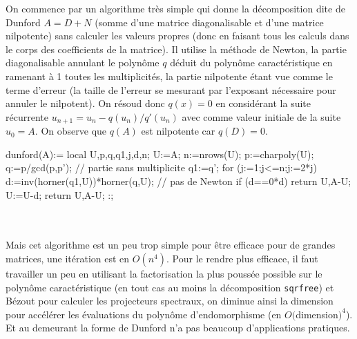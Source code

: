 \documentclass[a4paper,11pt]{book}
\begin{document}
\begin{giacjshere}
On commence par un algorithme tr\`es simple qui donne la d\'ecomposition
dite de Dunford $A=D+N$
(somme d'une matrice diagonalisable et d'une matrice
nilpotente) sans calculer les valeurs propres (donc en faisant
tous les calculs dans le corps des coefficients de la matrice).
Il utilise la m\'ethode de Newton, la partie diagonalisable
annulant le polyn\^ome $q$ d\'eduit du polyn\^ome caract\'eristique 
en ramenant \`a 1 toutes
les multiplicit\'es, la partie nilpotente \'etant vue comme le
terme d'erreur (la taille de l'erreur se mesurant
par l'exposant n\'ecessaire pour annuler le nilpotent). On r\'esoud
donc $q(x)=0$ en consid\'erant la suite r\'ecurrente
$u_{n+1}=u_n-q(u_n)/q'(u_n)$ avec comme valeur initiale de la suite $u_0=A$.
On observe que $q(A)$ est nilpotente car $q(D)=0$.
\begin{giacprog}
dunford(A):={
  local U,p,q,q1,j,d,n;
  U:=A;
  n:=nrows(U);
  p:=charpoly(U);
  q:=p/gcd(p,p'); // partie sans multiplicite
  q1:=q';
  for (j:=1;j<=n;j:=2*j){
    d:=inv(horner(q1,U))*horner(q,U); // pas de Newton
    if (d==0*d) return U,A-U;
    U:=U-d;
  }
  return U,A-U;
}:;
\end{giacprog}
\\
\\
Mais cet algorithme est un peu trop simple pour \^etre efficace pour de
grandes matrices, une it\'eration est en $O(n^4)$.
Pour le rendre plus efficace, il faut travailler un
peu en utilisant la factorisation la plus pouss\'ee possible sur le
polyn\^ome caract\'eristique (en tout cas au moins la d\'ecomposition
\verb|sqrfree|) et B\'ezout pour calculer les projecteurs spectraux,
on diminue ainsi la dimension pour acc\'el\'erer les \'evaluations du
polyn\^ome d'endomorphisme (en $O($dimension$)^4$). Et au demeurant
la forme de Dunford n'a pas beaucoup d'applications pratiques.


\end{giacjshere}
\end{document}
